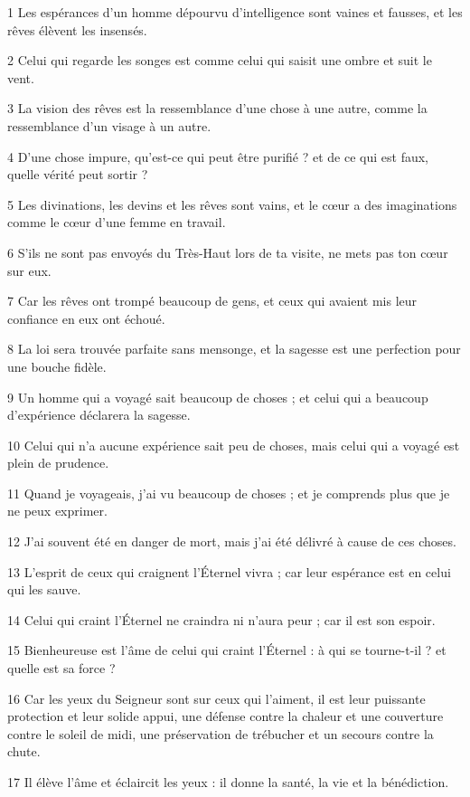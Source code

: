 \par 1 Les espérances d'un homme dépourvu d'intelligence sont vaines et fausses, et les rêves élèvent les insensés.
\par 2 Celui qui regarde les songes est comme celui qui saisit une ombre et suit le vent.
\par 3 La vision des rêves est la ressemblance d'une chose à une autre, comme la ressemblance d'un visage à un autre.
\par 4 D'une chose impure, qu'est-ce qui peut être purifié ? et de ce qui est faux, quelle vérité peut sortir ?
\par 5 Les divinations, les devins et les rêves sont vains, et le cœur a des imaginations comme le cœur d'une femme en travail.
\par 6 S'ils ne sont pas envoyés du Très-Haut lors de ta visite, ne mets pas ton cœur sur eux.
\par 7 Car les rêves ont trompé beaucoup de gens, et ceux qui avaient mis leur confiance en eux ont échoué.
\par 8 La loi sera trouvée parfaite sans mensonge, et la sagesse est une perfection pour une bouche fidèle.
\par 9 Un homme qui a voyagé sait beaucoup de choses ; et celui qui a beaucoup d'expérience déclarera la sagesse.
\par 10 Celui qui n'a aucune expérience sait peu de choses, mais celui qui a voyagé est plein de prudence.
\par 11 Quand je voyageais, j'ai vu beaucoup de choses ; et je comprends plus que je ne peux exprimer.
\par 12 J'ai souvent été en danger de mort, mais j'ai été délivré à cause de ces choses.
\par 13 L'esprit de ceux qui craignent l'Éternel vivra ; car leur espérance est en celui qui les sauve.
\par 14 Celui qui craint l'Éternel ne craindra ni n'aura peur ; car il est son espoir.
\par 15 Bienheureuse est l'âme de celui qui craint l'Éternel : à qui se tourne-t-il ? et quelle est sa force ?
\par 16 Car les yeux du Seigneur sont sur ceux qui l'aiment, il est leur puissante protection et leur solide appui, une défense contre la chaleur et une couverture contre le soleil de midi, une préservation de trébucher et un secours contre la chute.
\par 17 Il élève l'âme et éclaircit les yeux : il donne la santé, la vie et la bénédiction.
